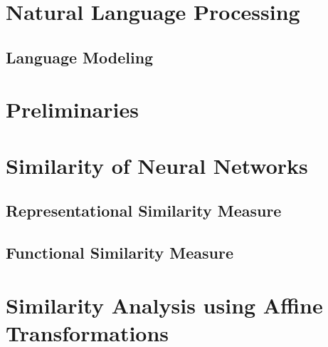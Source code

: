 \documentclass[a4paper, fontsize=12pt,
parskip=half,	%
department=FakIM,  %
twoside, %
DIV=15,BCOR=10mm, %
]{OTHRreprt}%
\begin{document}
        
        \chapter{Natural Language Processing}\label{NLP}
        
        \section{Language Modeling}\label{LangMod}
        
        
        \chapter{Preliminaries}\label{Preliminaries}
        
        \chapter{Similarity of Neural Networks}\label{SoNN}
        
        \section{Representational Similarity Measure}\label{RMS}
        
        \section{Functional Similarity Measure}\label{FMS}      
 
        \chapter{Similarity Analysis using Affine Transformations}\label{EA}    
        
        
\end{document}

